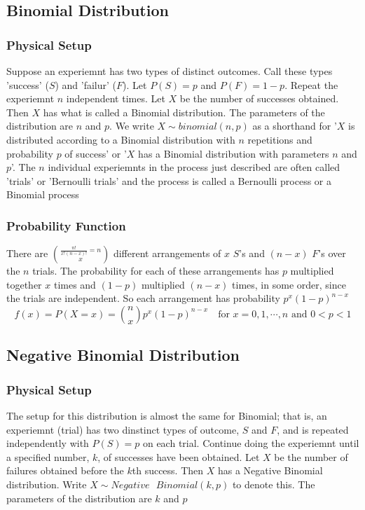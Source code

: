 \documentclass[11pt]{article}
\begin{document}
\subsection{Binomial Distribution}
\subsubsection{Physical Setup}
Suppose an experiemnt has two types of distinct outcomes. Call these types 'success' ($S$) and 'failur' ($F$). Let $P(S) = p$ and $P(F) = 1-p$. Repeat the experiemnt $n$ independent times. Let $X$ be the number of successes obtained. Then 
$X$ has what is called a Binomial distribution. The parameters of the distribution are $n$ and $p$. We write $X \sim binomial(n,p)$ as a shorthand for '$X$ is distributed according to a Binomial distribution with $n$ repetitions and probability $p$ of success' or '$X$ has a Binomial
distribution with parameters $n$ and $p$'. The $n$ individual experiemnts in the process just described are often called 'trials' or 'Bernoulli trials' and the process is called a Bernoulli process or a Binomial process 
\subsubsection{Probability Function}
There are $\frac{n!}{x!(n-x)!} = n\choose x$ different arrangements of $x$ $S$'s and $(n-x)$ $F$'s over the $n$ trials. The probability for each of these arrangements has $p$ multiplied together $x$ times 
and $(1-p)$ multiplied $(n-x)$ times, in some order, since the trials are independent. So each arrangement has probability $p^x(1-p)^{n-x}$
\[f(x) = P(X=x) = {n\choose x}p^x(1-p)^{n-x} \quad \text{for } x=0,1,\cdots,n \text{ and }0<p<1\]
\subsection{Negative Binomial Distribution}
\subsubsection{Physical Setup}
The setup for this distribution is almost the same for Binomial; that is, an experiemnt (trial) has two dinstinct types of outcome, $S$ and $F$, and is repeated independently 
with $P(S)=p$ on each trial. Continue doing the experiemnt until a specified number, $k$, of successes have been obtained. Let $X$ be the number of failures obtained before the $k$th success.
Then $X$ has a Negative Binomial distribution. Write $X\sim Negative\text{ }Binomial(k,p)$ to denote this. The parameters of the distribution are $k$ and $p$
\end{document}
